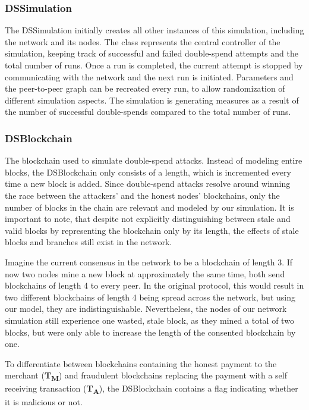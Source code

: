 \documentclass[a4paper,12pt,twoside]{report}
\begin{document}
\subsubsection{DSSimulation}
The DSSimulation initially creates all other instances of this simulation, including the network and its nodes. The class represents the central controller of the simulation, keeping track of successful and failed double-spend attempts and the total number of runs. Once a run is completed, the current attempt is stopped by communicating with the network and the next run is initiated. Parameters and the peer-to-peer graph can be recreated every run, to allow randomization of different simulation aspects. The simulation is generating measures as a result of the number of successful double-spends compared to the total number of runs.
\subsubsection{DSBlockchain}
The blockchain used to simulate double-spend attacks. Instead of modeling entire blocks, the DSBlockchain only consists of a length, which is incremented every time a new block is added. Since double-spend attacks resolve around winning the race between the attackers' and the honest nodes' blockchains, only the number of blocks in the chain are relevant and modeled by our simulation. It is important to note, that despite not explicitly distinguishing between stale and valid blocks by representing the blockchain only by its length, the effects of stale blocks and branches still exist in the network. 

Imagine the current consensus in the network to be a blockchain of length 3. If now two nodes mine a new block at approximately the same time, both send blockchains of length 4 to every peer. In the original protocol, this would result in two different blockchains of length 4 being spread across the network, but using our model, they are indistinguishable. Nevertheless, the nodes of our network simulation still experience one wasted, stale block, as they mined a total of two blocks, but were only able to increase the length of the consented blockchain by one.

To differentiate between blockchains containing the honest payment to the merchant (\textbf{T\textsubscript{M}}) and fraudulent blockchains replacing the payment with a self receiving transaction (\textbf{T\textsubscript{A}}), the DSBlockchain contains a flag indicating whether it is malicious or not.
\end{document}

